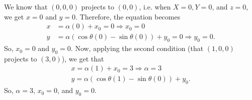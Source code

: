 \documentclass[a4paper]{article}
\begin{document}
We know that $(0, 0, 0)$ projects to $(0, 0)$, i.e. when $X = 0, Y = 0$, and $z = 0$, we get $x = 0$ and $y = 0$. Therefore, the equation becomes
\begin{align*}
    x &= \alpha (0) + x_0 = 0 \Longrightarrow x_0 = 0  \\
    y &= \alpha (\cos \theta (0)-\sin \theta (0)) + y_0 = 0 \Longrightarrow y_0 = 0.
\end{align*}
So, $x_0 = 0$ and $y_0 = 0$. Now, applying the second condition (that $(1, 0, 0)$ projects to $(3, 0)$), we get that
\begin{align*}
    x = \alpha(1) + x_0 = 3 \Longrightarrow \alpha = 3 \\
    y = \alpha(\cos \theta (1)-\sin \theta (0)) + y_0.
\end{align*}
So, $\alpha = 3$, $x_0 = 0$, and $y_0 = 0$.
\end{document}
